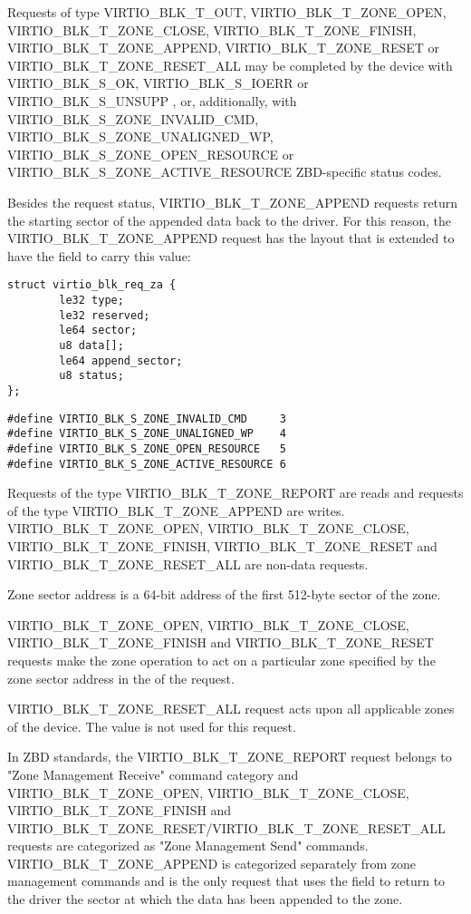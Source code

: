 Requests of type VIRTIO_BLK_T_OUT, VIRTIO_BLK_T_ZONE_OPEN,
VIRTIO_BLK_T_ZONE_CLOSE, VIRTIO_BLK_T_ZONE_FINISH, VIRTIO_BLK_T_ZONE_APPEND,
VIRTIO_BLK_T_ZONE_RESET or VIRTIO_BLK_T_ZONE_RESET_ALL may be completed by the
device with VIRTIO_BLK_S_OK, VIRTIO_BLK_S_IOERR or VIRTIO_BLK_S_UNSUPP
, or, additionally, with  VIRTIO_BLK_S_ZONE_INVALID_CMD,
VIRTIO_BLK_S_ZONE_UNALIGNED_WP, VIRTIO_BLK_S_ZONE_OPEN_RESOURCE or
VIRTIO_BLK_S_ZONE_ACTIVE_RESOURCE ZBD-specific status codes.

Besides the request status, VIRTIO_BLK_T_ZONE_APPEND requests return the
starting sector of the appended data back to the driver. For this reason,
the VIRTIO_BLK_T_ZONE_APPEND request has the layout that is extended to have
the  field to carry this value:

\begin{lstlisting}
struct virtio_blk_req_za {
        le32 type;
        le32 reserved;
        le64 sector;
        u8 data[];
        le64 append_sector;
        u8 status;
};
\end{lstlisting}

\begin{lstlisting}
#define VIRTIO_BLK_S_ZONE_INVALID_CMD     3
#define VIRTIO_BLK_S_ZONE_UNALIGNED_WP    4
#define VIRTIO_BLK_S_ZONE_OPEN_RESOURCE   5
#define VIRTIO_BLK_S_ZONE_ACTIVE_RESOURCE 6
\end{lstlisting}

Requests of the type VIRTIO_BLK_T_ZONE_REPORT are reads and requests of the type
VIRTIO_BLK_T_ZONE_APPEND are writes. VIRTIO_BLK_T_ZONE_OPEN,
VIRTIO_BLK_T_ZONE_CLOSE, VIRTIO_BLK_T_ZONE_FINISH, VIRTIO_BLK_T_ZONE_RESET and
VIRTIO_BLK_T_ZONE_RESET_ALL are non-data requests.

Zone sector address is a 64-bit address of the first 512-byte sector of the
zone.

VIRTIO_BLK_T_ZONE_OPEN, VIRTIO_BLK_T_ZONE_CLOSE, VIRTIO_BLK_T_ZONE_FINISH and
VIRTIO_BLK_T_ZONE_RESET requests make the zone operation to act on a particular
zone specified by the zone sector address in the  of the request.

VIRTIO_BLK_T_ZONE_RESET_ALL request acts upon all applicable zones of the
device. The  value is not used for this request.

In ZBD standards, the VIRTIO_BLK_T_ZONE_REPORT request belongs to "Zone
Management Receive" command category and VIRTIO_BLK_T_ZONE_OPEN,
VIRTIO_BLK_T_ZONE_CLOSE, VIRTIO_BLK_T_ZONE_FINISH and
VIRTIO_BLK_T_ZONE_RESET/VIRTIO_BLK_T_ZONE_RESET_ALL requests are categorized as
"Zone Management Send" commands. VIRTIO_BLK_T_ZONE_APPEND is categorized
separately from zone management commands and is the only request that uses
the  field  to return
to the driver the sector at which the data has been appended to the zone.

